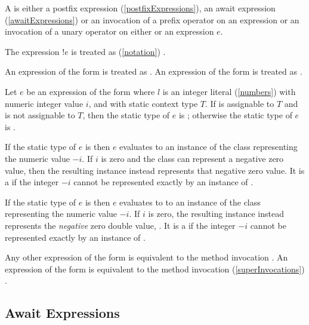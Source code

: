 \documentclass[makeidx]{article}
\begin{document}
\LMHash{}%
A  is either a postfix expression
(\ref{postfixExpressions}),
an await expression (\ref{awaitExpressions})
or an invocation of a prefix operator on an expression
or an invocation of a unary operator on either \SUPER{} or an expression $e$.

\LMHash{}%
The expression $!e$ is treated as
(\ref{notation})
.

\LMHash{}%
An expression of the form  is treated as
.
An expression of the form  is treated as
.

\LMHash{}%
Let $e$ be an expression of the form 
where $l$ is an integer literal (\ref{numbers}) with numeric integer value $i$,
and with static context type $T$.
If  is assignable to $T$ and  is not assignable to $T$,
then the static type of $e$ is ;
otherwise the static type of $e$ is .

\LMHash{}%
If the static type of $e$ is  then $e$ evaluates to
an instance of the  class representing the numeric value $-i$.
If $i$ is zero and the  class can represent a negative zero value,
then the resulting instance instead represents that negative zero value.
It is a  if the integer $-i$ cannot be represented
exactly by an instance of .

\LMHash{}%
If the static type of $e$ is  then $e$ evaluates to
to an instance of the  class representing the numeric value $-i$.
If $i$ is zero, the resulting instance instead represents the
\emph{negative} zero double value, .
It is a  if the integer $-i$ cannot be represented
exactly by an instance of .

\LMHash{}%
Any other expression of the form  is equivalent to
the method invocation .
An expression of the form \code{\op\,\,\SUPER} is equivalent to
the method invocation (\ref{superInvocations}) .


\subsection{Await Expressions}
\end{document}
